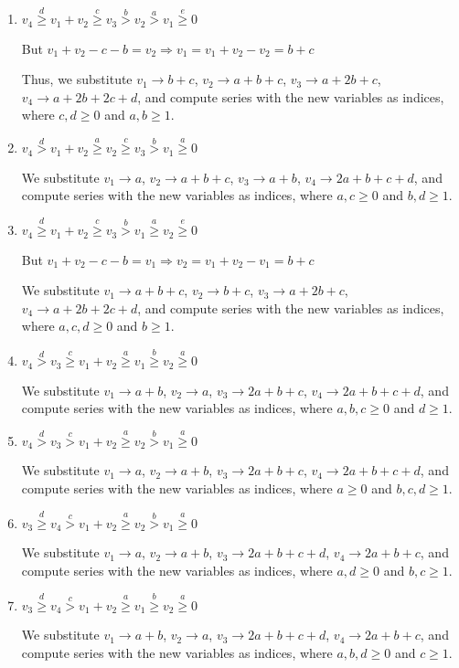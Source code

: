 \documentclass{article}
\begin{document}
\begin{enumerate}
\item 
$v_4\overset{d}{\geq}v_1+v_2\overset{c}{\geq}v_3\overset{b}{>}{v_2}\overset{a}{>}v_1\overset{e}{\geq}{0}$

But $v_1+v_2-c-b=v_2\Rightarrow{v_1=v_1+v_2-v_2=b+c}$

Thus, we substitute 
$v_1\rightarrow{b+c}$, 
$v_2\rightarrow{a+b+c}$, 
$v_3\rightarrow{a+2b+c}$, 
$v_4\rightarrow{a+2b+2c+d}$, and compute series with the new variables as indices, where $c,d\geq{0}$ and $a,b\geq{1}$.
\item 
$v_4\overset{d}{>}v_1+v_2\overset{a}{\geq}v_2\overset{c}{\geq}{v_3}\overset{b}{>}v_1\overset{a}{\geq}{0}$

We substitute 
$v_1\rightarrow{a}$, 
$v_2\rightarrow{a+b+c}$, 
$v_3\rightarrow{a+b}$, 
$v_4\rightarrow{2a+b+c+d}$, and compute series with the new variables as indices, where $a,c\geq{0}$ and $b,d\geq{1}$.
\item 
$v_4\overset{d}{\geq}v_1+v_2\overset{c}{\geq}v_3\overset{b}{>}{v_1}\overset{a}{\geq}v_2\overset{e}{\geq}{0}$

But $v_1+v_2-c-b=v_1\Rightarrow{v_2=v_1+v_2-v_1=b+c}$

We substitute 
$v_1\rightarrow{a+b+c}$, 
$v_2\rightarrow{b+c}$, 
$v_3\rightarrow{a+2b+c}$, 
$v_4\rightarrow{a+2b+2c+d}$, and compute series with the new variables as indices, where $a,c,d\geq{0}$ and $b\geq{1}$.
\item 
$v_4\overset{d}{>}v_3\overset{c}{\geq}v_1+v_2\overset{a}{\geq}{v_1}\overset{b}{\geq}v_2\overset{a}{\geq}{0}$

We substitute 
$v_1\rightarrow{a+b}$, 
$v_2\rightarrow{a}$, 
$v_3\rightarrow{2a+b+c}$, 
$v_4\rightarrow{2a+b+c+d}$, and compute series with the new variables as indices, where $a,b,c\geq{0}$ and $d\geq{1}$.
\item 
$v_4\overset{d}{>}v_3\overset{c}{>}v_1+v_2\overset{a}{\geq}{v_2}\overset{b}{>}v_1\overset{a}{\geq}{0}$

We substitute 
$v_1\rightarrow{a}$, 
$v_2\rightarrow{a+b}$, 
$v_3\rightarrow{2a+b+c}$, 
$v_4\rightarrow{2a+b+c+d}$, and compute series with the new variables as indices, where $a\geq{0}$ and $b,c,d\geq{1}$.
\item 
$v_3\overset{d}{\geq}v_4\overset{c}{>}v_1+v_2\overset{a}{\geq}{v_2}\overset{b}{>}v_1\overset{a}{\geq}{0}$

We substitute 
$v_1\rightarrow{a}$, 
$v_2\rightarrow{a+b}$, 
$v_3\rightarrow{2a+b+c+d}$, 
$v_4\rightarrow{2a+b+c}$, and compute series with the new variables as indices, where $a,d\geq{0}$ and $b,c\geq{1}$.
\item 
$v_3\overset{d}{\geq}v_4\overset{c}{>}v_1+v_2\overset{a}{\geq}{v_1}\overset{b}{\geq}v_2\overset{a}{\geq}{0}$

We substitute 
$v_1\rightarrow{a+b}$, 
$v_2\rightarrow{a}$, 
$v_3\rightarrow{2a+b+c+d}$, 
$v_4\rightarrow{2a+b+c}$, and compute series with the new variables as indices, where $a,b,d\geq{0}$ and $c\geq{1}$.
\end{enumerate}
\end{document}

